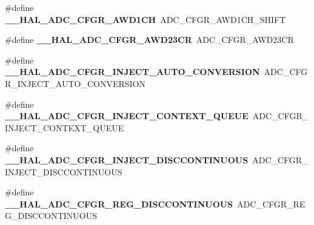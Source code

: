 \begin{DoxyCompactItemize}
\mbox{\label{group___h_a_l___a_d_c___aliased___macros_gaf2b93300d6c91bbe5a0253368ade466f}} 
\#define {\bfseries \+\_\+\+\_\+\+H\+A\+L\+\_\+\+A\+D\+C\+\_\+\+C\+F\+G\+R\+\_\+\+A\+W\+D1\+CH}~A\+D\+C\+\_\+\+C\+F\+G\+R\+\_\+\+A\+W\+D1\+C\+H\+\_\+\+S\+H\+I\+FT
\item 
\mbox{\label{group___h_a_l___a_d_c___aliased___macros_ga73200fff4fe5aa62989ea33522fa3cfc}} 
\#define {\bfseries \+\_\+\+\_\+\+H\+A\+L\+\_\+\+A\+D\+C\+\_\+\+C\+F\+G\+R\+\_\+\+A\+W\+D23\+CR}~A\+D\+C\+\_\+\+C\+F\+G\+R\+\_\+\+A\+W\+D23\+CR
\item 
\mbox{\label{group___h_a_l___a_d_c___aliased___macros_ga16b4ff7c58c0fe8141bd8bf6adf0f27c}} 
\#define {\bfseries \+\_\+\+\_\+\+H\+A\+L\+\_\+\+A\+D\+C\+\_\+\+C\+F\+G\+R\+\_\+\+I\+N\+J\+E\+C\+T\+\_\+\+A\+U\+T\+O\+\_\+\+C\+O\+N\+V\+E\+R\+S\+I\+ON}~A\+D\+C\+\_\+\+C\+F\+G\+R\+\_\+\+I\+N\+J\+E\+C\+T\+\_\+\+A\+U\+T\+O\+\_\+\+C\+O\+N\+V\+E\+R\+S\+I\+ON
\item 
\mbox{\label{group___h_a_l___a_d_c___aliased___macros_ga5010d7820f890534d6b6005438038ef5}} 
\#define {\bfseries \+\_\+\+\_\+\+H\+A\+L\+\_\+\+A\+D\+C\+\_\+\+C\+F\+G\+R\+\_\+\+I\+N\+J\+E\+C\+T\+\_\+\+C\+O\+N\+T\+E\+X\+T\+\_\+\+Q\+U\+E\+UE}~A\+D\+C\+\_\+\+C\+F\+G\+R\+\_\+\+I\+N\+J\+E\+C\+T\+\_\+\+C\+O\+N\+T\+E\+X\+T\+\_\+\+Q\+U\+E\+UE
\item 
\mbox{\label{group___h_a_l___a_d_c___aliased___macros_gaeaa692ac73b859de118c28bc0327cf77}} 
\#define {\bfseries \+\_\+\+\_\+\+H\+A\+L\+\_\+\+A\+D\+C\+\_\+\+C\+F\+G\+R\+\_\+\+I\+N\+J\+E\+C\+T\+\_\+\+D\+I\+S\+C\+C\+O\+N\+T\+I\+N\+U\+O\+US}~A\+D\+C\+\_\+\+C\+F\+G\+R\+\_\+\+I\+N\+J\+E\+C\+T\+\_\+\+D\+I\+S\+C\+C\+O\+N\+T\+I\+N\+U\+O\+US
\item 
\mbox{\label{group___h_a_l___a_d_c___aliased___macros_gad118cacc67e8c3f930008f5aa6d8dade}} 
\#define {\bfseries \+\_\+\+\_\+\+H\+A\+L\+\_\+\+A\+D\+C\+\_\+\+C\+F\+G\+R\+\_\+\+R\+E\+G\+\_\+\+D\+I\+S\+C\+C\+O\+N\+T\+I\+N\+U\+O\+US}~A\+D\+C\+\_\+\+C\+F\+G\+R\+\_\+\+R\+E\+G\+\_\+\+D\+I\+S\+C\+C\+O\+N\+T\+I\+N\+U\+O\+US
\item 

\end{DoxyCompactItemize}
